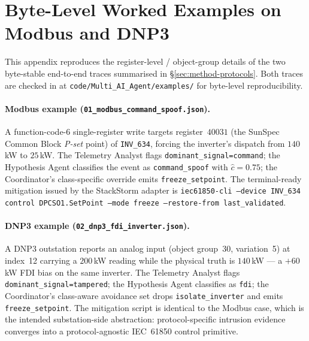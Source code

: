 \section{Byte-Level Worked Examples on Modbus and DNP3}
\label{sec:appendix-protocols}

This appendix reproduces the register-level / object-group
details of the two byte-stable end-to-end traces summarised in
\S\ref{sec:method-protocols}. Both traces are checked in at
\texttt{code/Multi\_AI\_Agent/examples/} for byte-level
reproducibility.

\paragraph{Modbus example
(\texttt{01\_modbus\_command\_spoof.json}).}
A function-code-6 single-register write targets register~$40031$
(the SunSpec Common Block \textit{P-set} point) of
\texttt{INV\_634}, forcing the inverter's dispatch from $140$\,kW
to $25$\,kW. The Telemetry Analyst flags
\texttt{dominant\_signal=command}; the Hypothesis Agent classifies
the event as \texttt{command\_spoof} with $\hat{c}=0.75$; the
Coordinator's class-specific override emits
\texttt{freeze\_setpoint}. The terminal-ready mitigation issued by
the StackStorm adapter is
\texttt{iec61850-cli --device INV\_634 control DPCSO1.SetPoint
--mode freeze --restore-from last\_validated}.

\paragraph{DNP3 example (\texttt{02\_dnp3\_fdi\_inverter.json}).}
A DNP3 outstation reports an analog input (object group~30,
variation~5) at index~12 carrying a $200$\,kW reading while the
physical truth is $140$\,kW --- a $+60$\,kW FDI bias on the same
inverter. The Telemetry Analyst flags
\texttt{dominant\_signal=tampered}; the Hypothesis Agent classifies
as \texttt{fdi}; the Coordinator's class-aware avoidance set drops
\texttt{isolate\_inverter} and emits \texttt{freeze\_setpoint}.
The mitigation script is identical to the Modbus case, which is
the intended substation-side abstraction: protocol-specific
intrusion evidence converges into a protocol-agnostic IEC~61850
control primitive.
